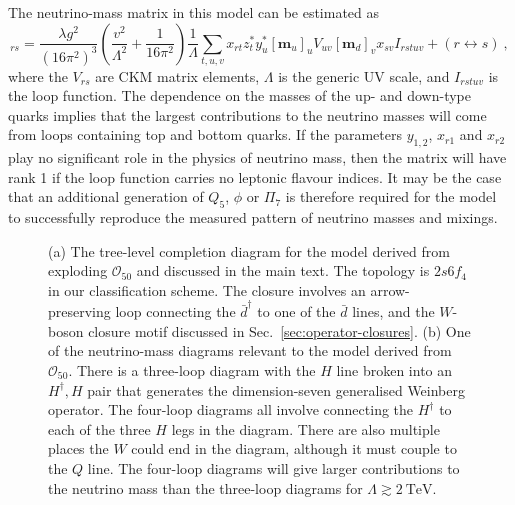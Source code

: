 The neutrino-mass matrix in this model can be estimated as
\begin{equation}
  [\mathbf{m}_{\nu}]_{rs} = \frac{\lambda g^{2}}{(16\pi^{2})^{3}} \left( \frac{v^{2}}{\Lambda^{2}} + \frac{1}{16\pi^{2}}\right) \frac{1}{\Lambda}\sum_{t,u,v} x_{rt} z^{*}_{t} y^{*}_{u} [\mathbf{m}_{u}]_{u} V_{uv} [\mathbf{m}_{d}]_{v} x_{sv} I_{rstuv} + (r \leftrightarrow s) \ ,
\end{equation}
where the $V_{rs}$ are CKM matrix elements, $\Lambda$ is the generic UV scale,
and $I_{rstuv}$ is the loop function. The dependence on the masses of the up-
and down-type quarks implies that the largest contributions to the neutrino
masses will come from loops containing top and bottom quarks. If the parameters
$y_{1,2}$, $x_{r1}$ and $x_{r2}$ play no significant role in the physics of
neutrino mass, then the matrix will have rank 1 if the loop function carries no
leptonic flavour indices. It may be the case that an additional generation of
$Q_{5}$, $\phi$ or $\Pi_{7}$ is therefore required for the model to successfully
reproduce the measured pattern of neutrino masses and mixings.

\begin{figure}[t]
  \centering
  \caption{(a) The tree-level completion diagram for the model derived from
    exploding $\mathcal{O}_{50}$ and discussed in the main text. The topology
    is $2s6f_{4}$ in our classification scheme. The closure involves an
    arrow-preserving loop connecting the $\bar{d}^{\dagger}$ to one of the
    $\bar{d}$ lines, and the $W$-boson closure motif discussed in
    Sec.~\ref{sec:operator-closures}. (b) One of the neutrino-mass diagrams
    relevant to the model derived from $\mathcal{O}_{50}$. There is a
    three-loop diagram with the $H$ line broken into an $H^{\dagger}, H$ pair
    that generates the dimension-seven generalised Weinberg operator. The
    four-loop diagrams all involve connecting the $H^{\dagger}$ to each of the
    three $H$ legs in the diagram. There are also multiple places the $W$ could
    end in the diagram, although it must couple to the $Q$ line. The four-loop
    diagrams will give larger contributions to the neutrino mass than the
    three-loop diagrams for $\Lambda \gtrsim \SI{2}{\TeV}$.}
  \label{fig:lowscale-example}
\end{figure}

